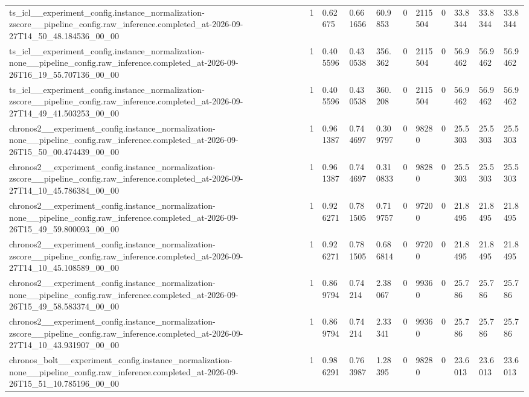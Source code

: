 \begin{tabular}{lllllllllll}
ts\_icl\_\_experiment\_config.instance\_normalization-zscore\_\_pipeline\_config.raw\_inference.completed\_at-2026-09-27T14\_50\_48.184536\_00\_00 & 1 & 0.62675 & 0.661656 & 60.9853 & 0 & 2115504 & 0 & 33.8344 & 33.8344 & 33.8344 \\
ts\_icl\_\_experiment\_config.instance\_normalization-none\_\_pipeline\_config.raw\_inference.completed\_at-2026-09-26T16\_19\_55.707136\_00\_00 & 1 & 0.405596 & 0.430538 & 356.362 & 0 & 2115504 & 0 & 56.9462 & 56.9462 & 56.9462 \\
ts\_icl\_\_experiment\_config.instance\_normalization-zscore\_\_pipeline\_config.raw\_inference.completed\_at-2026-09-27T14\_49\_41.503253\_00\_00 & 1 & 0.405596 & 0.430538 & 360.208 & 0 & 2115504 & 0 & 56.9462 & 56.9462 & 56.9462 \\
chronos2\_\_experiment\_config.instance\_normalization-none\_\_pipeline\_config.raw\_inference.completed\_at-2026-09-26T15\_50\_00.474439\_00\_00 & 1 & 0.961387 & 0.744697 & 0.309797 & 0 & 98280 & 0 & 25.5303 & 25.5303 & 25.5303 \\
chronos2\_\_experiment\_config.instance\_normalization-zscore\_\_pipeline\_config.raw\_inference.completed\_at-2026-09-27T14\_10\_45.786384\_00\_00 & 1 & 0.961387 & 0.744697 & 0.310833 & 0 & 98280 & 0 & 25.5303 & 25.5303 & 25.5303 \\
chronos2\_\_experiment\_config.instance\_normalization-none\_\_pipeline\_config.raw\_inference.completed\_at-2026-09-26T15\_49\_59.800093\_00\_00 & 1 & 0.926271 & 0.781505 & 0.719757 & 0 & 97200 & 0 & 21.8495 & 21.8495 & 21.8495 \\
chronos2\_\_experiment\_config.instance\_normalization-zscore\_\_pipeline\_config.raw\_inference.completed\_at-2026-09-27T14\_10\_45.108589\_00\_00 & 1 & 0.926271 & 0.781505 & 0.686814 & 0 & 97200 & 0 & 21.8495 & 21.8495 & 21.8495 \\
chronos2\_\_experiment\_config.instance\_normalization-none\_\_pipeline\_config.raw\_inference.completed\_at-2026-09-26T15\_49\_58.583374\_00\_00 & 1 & 0.869794 & 0.74214 & 2.38067 & 0 & 99360 & 0 & 25.786 & 25.786 & 25.786 \\
chronos2\_\_experiment\_config.instance\_normalization-zscore\_\_pipeline\_config.raw\_inference.completed\_at-2026-09-27T14\_10\_43.931907\_00\_00 & 1 & 0.869794 & 0.74214 & 2.33341 & 0 & 99360 & 0 & 25.786 & 25.786 & 25.786 \\
chronos\_bolt\_\_experiment\_config.instance\_normalization-none\_\_pipeline\_config.raw\_inference.completed\_at-2026-09-26T15\_51\_10.785196\_00\_00 & 1 & 0.986291 & 0.763987 & 1.28395 & 0 & 98280 & 0 & 23.6013 & 23.6013 & 23.6013 \\

\end{tabular}
